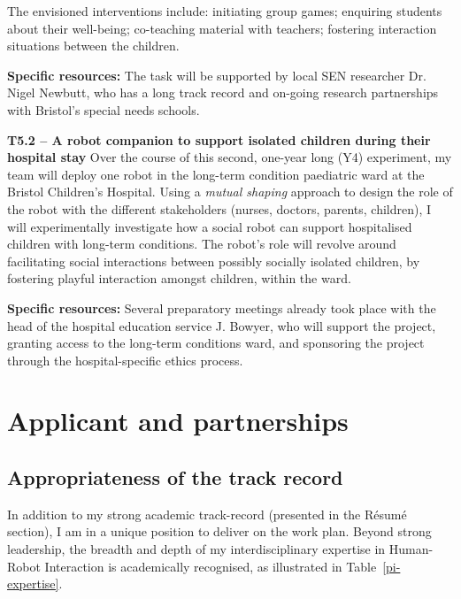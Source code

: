 The envisioned interventions include: initiating group games; enquiring students
about their well-being; co-teaching material with teachers; fostering
interaction situations between the children.

\textbf{Specific resources:} The task will be supported by local SEN researcher
Dr. Nigel Newbutt, who has a long track record and on-going research
partnerships with Bristol's special needs schools.


\textbf{T5.2 -- A robot companion to support isolated children during their
hospital stay} Over the course of this second, one-year long (Y4)
experiment, my team will deploy one \project robot in the long-term condition
paediatric ward at the Bristol Children's Hospital.  Using a \emph{mutual shaping}
approach to design the role of the robot with the
different stakeholders (nurses, doctors, parents, children), I will
experimentally investigate how a social robot can support hospitalised children
with long-term conditions. The robot's role will revolve around facilitating
social interactions between possibly socially isolated children, by fostering
playful interaction amongst children, within the ward.

\textbf{Specific resources:} Several preparatory meetings already took place
with the head of the hospital education service J. Bowyer, who will support the
project, granting access to the long-term conditions ward, and sponsoring the
project through the hospital-specific ethics process.

\pagebreak



\section{Applicant and partnerships}

\subsection{Appropriateness of the track record}

In addition to my strong academic track-record (presented in the Résumé
section), I am in a unique position to deliver on the \project work plan. Beyond
strong leadership, the breadth and depth of my interdisciplinary expertise in
Human-Robot Interaction is academically recognised, as illustrated in
Table~\ref{pi-expertise}.

